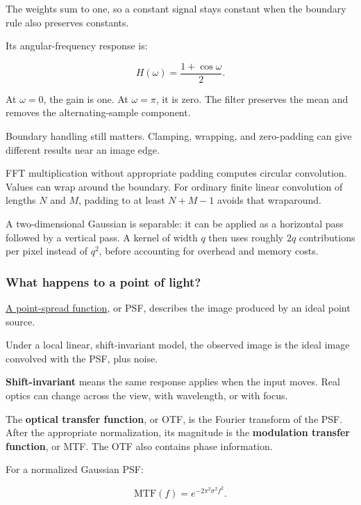 The weights sum to one, so a constant signal stays constant when the boundary rule also preserves constants.

Its angular-frequency response is:

\[
H(\omega)=\frac{1+\cos\omega}{2}.
\]

At \(\omega=0\), the gain is one. At \(\omega=\pi\), it is zero. The filter preserves the mean and removes the alternating-sample component.

Boundary handling still matters. Clamping, wrapping, and zero-padding can give different results near an image edge.

FFT multiplication without appropriate padding computes circular convolution. Values can wrap around the boundary. For ordinary finite linear convolution of lengths \(N\) and \(M\), padding to at least \(N+M-1\) avoids that wraparound.

A two-dimensional Gaussian is separable: it can be applied as a horizontal pass followed by a vertical pass. A kernel of width \(q\) then uses roughly \(2q\) contributions per pixel instead of \(q^2\), before accounting for overhead and memory costs.

\subsubsection{What happens to a point of light?}\label{04-visual-computing-ii-ch042-what-happens-to-a-point-of-light}

\hypertarget{04-visual-computing-ii-ch042-what-happens-to-a-point-of-light}{}

\hyperref[appendix-8b76b0efd27f]{A point-spread function}, or PSF, describes the image produced by an ideal point source.

Under a local linear, shift-invariant model, the observed image is the ideal image convolved with the PSF, plus noise.

\textbf{Shift-invariant} means the same response applies when the input moves. Real optics can change across the view, with wavelength, or with focus.

The \textbf{optical transfer function}, or OTF, is the Fourier transform of the PSF. After the appropriate normalization, its magnitude is the \textbf{modulation transfer function}, or MTF. The OTF also contains phase information.

For a normalized Gaussian PSF:

\[
\mathrm{MTF}(f)=e^{-2\pi^2\sigma^2f^2}.
\]

